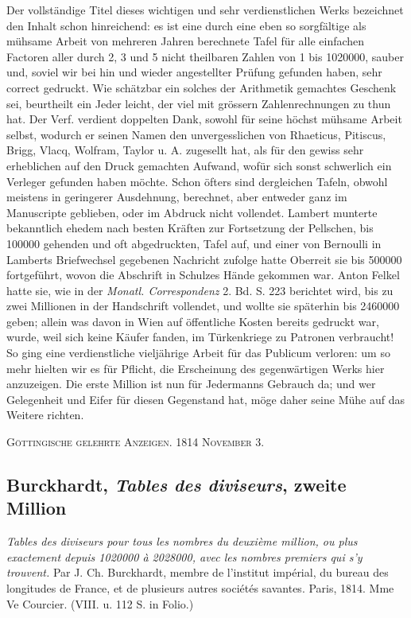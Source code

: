 \documentclass[12pt]{article}
\begin{document}
Der vollständige Titel dieses wichtigen und sehr verdienstlichen Werks bezeichnet den Inhalt schon hinreichend: es ist eine durch eine eben so sorgfältige als mühsame Arbeit von mehreren Jahren berechnete Tafel für alle einfachen Factoren aller durch 2, 3 und 5 nicht theilbaren Zahlen von 1 bis 1020000, sauber und, soviel wir bei hin und wieder angestellter Prüfung gefunden haben, sehr correct gedruckt. Wie schätzbar ein solches der Arithmetik gemachtes Geschenk sei, beurtheilt ein Jeder leicht, der viel mit grössern Zahlenrechnungen zu thun hat. Der Verf. verdient doppelten Dank, sowohl für seine höchst mühsame Arbeit selbst, wodurch er seinen Namen den unvergesslichen von Rhaeticus, Pitiscus, Brigg, Vlacq, Wolfram, Taylor u. A. zugesellt hat, als für den gewiss sehr erheblichen auf den Druck gemachten Aufwand, wofür sich sonst schwerlich ein Verleger gefunden haben möchte. Schon öfters sind dergleichen Tafeln, obwohl meistens in geringerer Ausdehnung, berechnet, aber entweder ganz im Manuscripte geblieben, oder im Abdruck nicht vollendet. Lambert munterte bekanntlich ehedem nach besten Kräften zur Fortsetzung der Pellschen, bis 100000 gehenden und oft abgedruckten, Tafel auf, und einer von Bernoulli in Lamberts Briefwechsel gegebenen Nachricht zufolge hatte Oberreit sie bis 500000 fortgeführt, wovon die Abschrift in Schulzes Hände gekommen war. Anton Felkel hatte sie, wie in der \textit{Monatl. Correspondenz} 2. Bd. S. 223 berichtet wird, bis zu zwei Millionen in der Handschrift vollendet, und wollte sie späterhin bis 2460000 geben; allein was davon in Wien auf öffentliche Kosten bereits gedruckt war, wurde, weil sich keine Käufer fanden, im Türkenkriege zu Patronen verbraucht! So ging eine verdienstliche vieljährige Arbeit für das Publicum verloren: um so mehr hielten wir es für Pflicht, die Erscheinung des gegenwärtigen Werks hier anzuzeigen. Die erste Million ist nun für Jedermanns Gebrauch da; und wer Gelegenheit und Eifer für diesen Gegenstand hat, möge daher seine Mühe auf das Weitere richten.

\begin{center}
\textsc{Göttingische gelehrte Anzeigen. 1814 November 3.}
\end{center}

\subsection*{Burckhardt, \textit{Tables des diviseurs}, zweite Million}

\begin{center}
\textit{Tables des diviseurs pour tous les nombres du deuxième million, ou plus exactement depuis 1020000 à 2028000, avec les nombres premiers qui s'y trouvent.} Par J. Ch. Burckhardt, membre de l'institut impérial, du bureau des longitudes de France, et de plusieurs autres sociétés savantes. Paris, 1814. Mme Ve Courcier. (VIII. u. 112 S. in Folio.)
\end{center}
\end{document}
